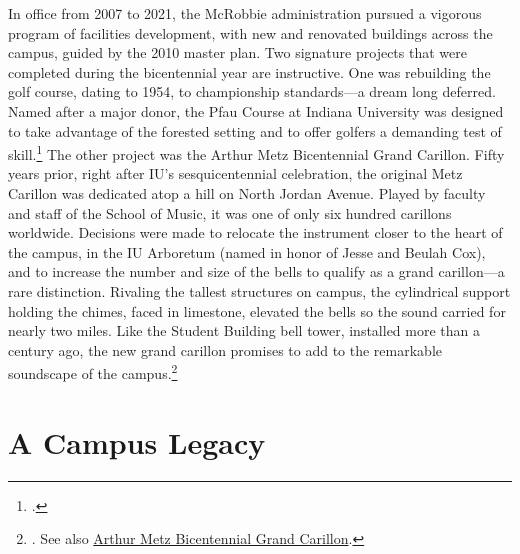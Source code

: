 \documentclass[
  american,
  letterpaper,
]{scrreprt}
\begin{document}
In office from 2007 to 2021, the McRobbie administration pursued a
vigorous program of facilities development, with new and renovated
buildings across the campus, guided by the 2010 master plan. Two
signature projects that were completed during the bicentennial year are
instructive. One was rebuilding the golf course, dating to 1954, to
championship standards---a dream long deferred. Named after a major
donor, the Pfau Course at Indiana University was designed to take
advantage of the forested setting and to offer golfers a demanding test
of skill.\footnote{.}
The other project was the Arthur Metz Bicentennial Grand Carillon. Fifty
years prior, right after IU's sesquicentennial celebration, the original
Metz Carillon was dedicated atop a hill on North Jordan Avenue. Played
by faculty and staff of the School of Music, it was one of only six
hundred carillons worldwide. Decisions were made to relocate the
instrument closer to the heart of the campus, in the IU Arboretum (named
in honor of Jesse and Beulah Cox), and to increase the number and size
of the bells to qualify as a grand carillon---a rare distinction.
Rivaling the tallest structures on campus, the cylindrical support
holding the chimes, faced in limestone, elevated the bells so the sound
carried for nearly two miles. Like the Student Building bell tower,
installed more than a century ago, the new grand carillon promises to
add to the remarkable soundscape of the campus.\footnote{.
  See also
  \href{https://web.archive.org/web/20201014090913/https://200.iu.edu/signature-projects/heritage-art-campus/heritage-preservation1/grand-carillon.html}{Arthur
  Metz Bicentennial Grand Carillon}.}

\section{A Campus Legacy}\label{a-campus-legacy}
\end{document}

